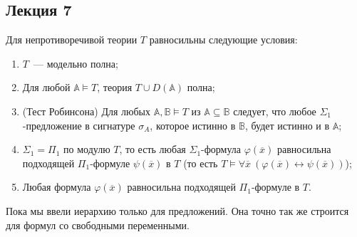 \subsection{Лекция 7}

\begin{theorem} Для непротиворечивой теории $T$ равносильны следующие условия:
    \begin{enumerate}
        \item $T$~— модельно полна; 
        \item Для любой $\mathbb{A} \models T$, теория $T \cup D(\mathbb{A})$ полна; 
        \item (Тест Робинсона) Для любых $\mathbb{A}, \mathbb{B} \models T$ из $\mathbb{A} \subseteq \mathbb{B}$ следует, что любое $\Sigma_1$-предложение в сигнатуре $\sigma_A$, которое истинно в $\mathbb{B}$, будет истинно и в $\mathbb{A}$; 
        \item $\Sigma_1 = \Pi_1$ по модулю $T$, то есть любая $\Sigma_1$-формула $\varphi(\overline{x})$ равносильна подходящей $\Pi_1$-формуле $\psi(\overline{x})$ в $T$ (то есть $T \models \forall \overline{x}~(\varphi(\overline{x}) \leftrightarrow \psi (\overline{x}))$); 
        \item Любая формула $\varphi(\overline{x})$ равносильна подходящей $\Pi_1$-формуле в $T$.
    \end{enumerate}
\end{theorem}

\begin{remark}
    Пока мы ввели иерархию только для предложений. Она точно так же строится для формул со свободными переменными.
\end{remark}

